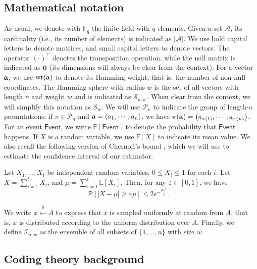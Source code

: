 \subsection{Mathematical notation}

As usual, we denote with $\mathbb F_q$ the finite field with $q$ elements.
Given a set $\mathscr A$, its cardinality (i.e., its number of elements) is indicated as $|\mathscr A|$.
We use bold capital letters to denote matrices, and small capital letters to denote vectors.
The operator $(\cdot)^\top$ denotes the transposition operation, while the null matrix is indicated as $\mathbf0$ (its dimensions will always be clear from the context).
For a vector $\mathbf a$, we use $\mathrm{wt}(\mathbf a)$ to denote its Hamming weight, that is, the number of non null coordinates.
The Hamming sphere with radius $w$ is the set of all vectors with length $n$ and weight $w$ and is indicated as $\mathscr S_{n,w}$. When clear from the context, we will simplify this notation as $\mathscr{S}_w$.
We will use $\mathscr P_n$ to indicate the group of length-$n$ permutations: if $\pi \in \mathscr P_n$ and $\mathbf a = (a_1,\cdots,a_n)$, we have $\pi(\mathbf a) = \big(a_{\pi(1)},\cdots,a_{\pi(n)}\big)$.
For an event $\mathsf{Event}$, we write $\mathbb{P}\left[\mathsf{Event}\right]$ to denote the probability that $\mathsf{Event}$ happens. 
If $X$ is a random variable, we use $\mathbb E[X]$ to indicate its mean value.
We also recall the following version of Chernoff's bound \cite{doerr2020probabilistic}, which we will use to estimate the confidence interval of our estimator.

\begin{theorem}
\label{the:chernoff}
Let $X_1,\ldots,X_t$ be independent random variables, $0\leq X_i\leq 1$ for each $i$. Let $X = \sum_{i = 1}^t X_i$, and $\mu = \sum_{i = 1}^t\mathbb E[X_i]$.
Then, for any $\varepsilon \in [0,1]$, we have
$$\mathbb P\left[|X-\mu|\geq \varepsilon \mu\right]\leq 2 e^{-\frac{ \mu \varepsilon^2}{3}}.$$
\end{theorem}
We write $x\xleftarrow{\$}A$ to express that $x$ is sampled uniformly at random from $A$, that is, $x$ is distributed according to the uniform distribution over  $A$.
Finally, we define $\mathscr I_{n,w}$ as the ensemble of all subsets of $\{1,\ldots,n\}$ with size $w$.

\subsection{Coding theory background}


